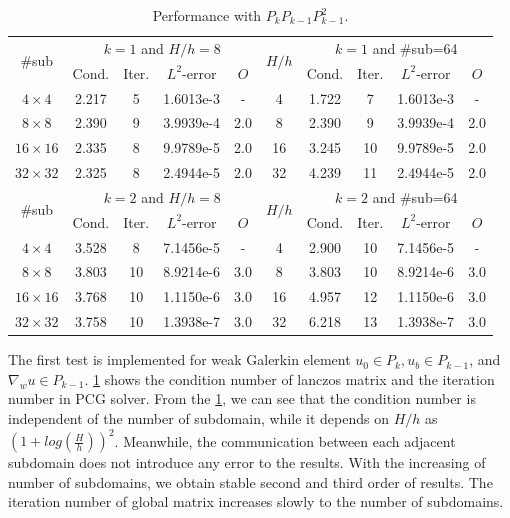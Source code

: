 \begin{table}[h]
	\setlength{\tabcolsep}{2pt} {
		\caption{ Performance with $P_{k}P_{k-1}P_{k-1}^2$.}
		\label{Tab:case1_PkPk-1Pk-1}
		\vspace{-5pt}
		\begin{center}
			\begin{tabular}{c|cccc|c|cccc}
				\hline
				\multirow{2}{*}{\#sub} &\multicolumn{4}{c|}{$k=1$ and $H/h=8$} &\multirow{2}{*}{$H/h$} &\multicolumn{4}{c}{$k=1$ and \#sub=64}\\ 
				& Cond.   & Iter. &$L^2$-error & $ O $ & & Cond.   & Iter. &$L^2$-error &$ O $ \\
				\hline
				$4\times 4$     &2.217 &5 &1.6013e-3 &- &4   &1.722 &7   &1.6013e-3 & -\\
				$8\times 8$     &2.390 &9 &3.9939e-4 & 2.0 &8   &2.390 &9   &3.9939e-4& 2.0\\
				$16\times 16$ &2.335 &8 &9.9789e-5 & 2.0 &16 &3.245 &10 &9.9789e-5 & 2.0\\
				$32\times 32$ &2.325 &8 &2.4944e-5 & 2.0 &32 &4.239 &11 &2.4944e-5 & 2.0 \\
				\hline
				\multirow{2}{*}{\#sub} &\multicolumn{4}{c|}{$k=2$ and $H/h=8$} &\multirow{2}{*}{$H/h$} &\multicolumn{4}{c}{$k=2$ and \#sub=64}\\ 
				& Cond.   & Iter. &$L^2$-error & $ O $ & & Cond.   & Iter. &$L^2$-error & $ O $  \\
				\hline
				$4\times 4$    &3.528 & 8  &7.1456e-5 & -  &4   &2.900 &10 &7.1456e-5 & - \\
				$8\times 8$    &3.803 &10 &8.9214e-6 & 3.0 &8   &3.803 &10 &8.9214e-6 & 3.0 \\
				$16\times 16$&3.768 &10 &1.1150e-6 & 3.0 &16 &4.957 &12 &1.1150e-6 & 3.0 \\
				$32\times 32$&3.758 &10 &1.3938e-7 & 3.0 &32 &6.218 &13 &1.3938e-7 & 3.0\\
				\hline
			\end{tabular}
		\end{center} }
	\end{table}
	
	The first test is implemented for weak Galerkin element $ u_0 \in P_k, u_b \in P_{k - 1} $, and $ \nabla_w u \in P_{k - 1} $. \ref{Tab:case1_PkPk-1Pk-1} shows the condition number of lanczos matrix and the iteration number in PCG solver. From the \ref{Tab:case1_PkPk-1Pk-1}, we can see that the condition number is independent of the number of subdomain, while it depends on $ H/h $ as $ (1 + log(\frac{H}{h}))^{2} $. Meanwhile, the communication between each adjacent subdomain does not introduce any error to the results. With the increasing of number of subdomains, we obtain stable second and third order of results. The iteration number of global matrix increases slowly to the number of subdomains.
	
